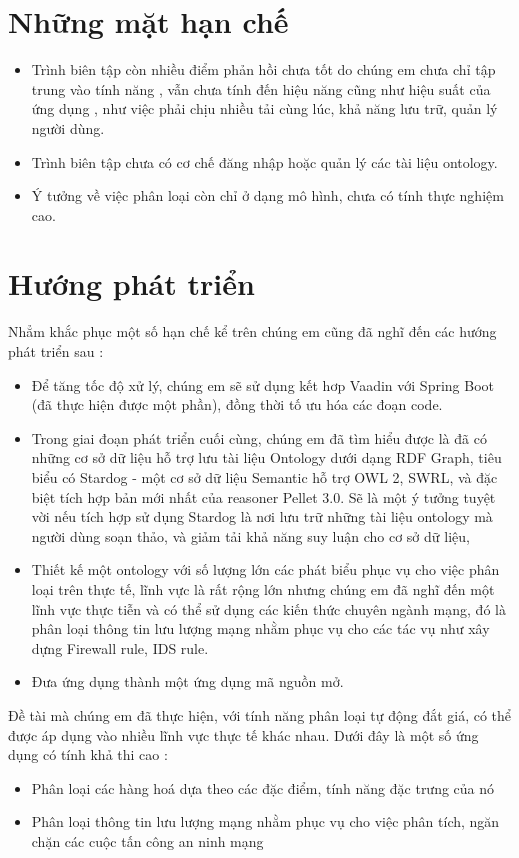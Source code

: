 \section{Những mặt hạn chế}
\begin{itemize}
\item Trình biên tập còn nhiều điểm phản hồi chưa tốt do chúng em chưa chỉ tập trung vào tính năng , vẫn chưa tính đến hiệu năng cũng như hiệu suất của ứng dụng , như việc phải chịu nhiều tải cùng lúc, khả năng lưu trữ, quản lý người dùng.
\item Trình biên tập chưa có cơ chế đăng nhập hoặc quản lý các tài liệu ontology.
\item Ý tưởng về việc phân loại còn chỉ ở dạng mô hình, chưa có tính thực nghiệm cao.
\end{itemize}
\section{Hướng phát triển}
Nhẳm khắc phục một số hạn chế kể trên chúng em cũng đã nghĩ đến các hướng phát triển sau :
\begin{itemize}
\item Để tăng tốc độ xử lý, chúng em sẽ sử dụng kết hơp Vaadin với Spring Boot (đã thực hiện được một phần), đồng thời tố ưu hóa các đoạn code.
\item Trong giai đoạn phát triển cuối cùng, chúng em đã tìm hiểu được là đã có những cơ sở dữ liệu hỗ trợ lưu tài liệu Ontology dưới dạng RDF Graph, tiêu biểu có Stardog - một cơ sở dữ liệu Semantic hỗ trợ OWL 2, SWRL, và đặc biệt tích hợp bản mới nhất của reasoner Pellet 3.0. Sẽ là một ý tưởng tuyệt vời nếu tích hợp sử dụng Stardog là nơi lưu trữ những tài liệu ontology mà người dùng soạn thảo, và giảm tải khả năng suy luận cho cơ sở dữ liệu,
\item Thiết kế một ontology với số lượng lớn các phát biểu phục vụ cho việc phân loại trên thực tế, lĩnh vực là rất rộng lớn nhưng chúng em đã nghĩ đến một lĩnh vực thực tiễn và có thể sử dụng các kiến thức chuyên ngành mạng, đó là phân loại thông tin lưu lượng mạng nhằm phục vụ cho các tác vụ như xây dựng Firewall rule, IDS rule.
\item Đưa ứng dụng thành một ứng dụng mã nguồn mở.
\end{itemize}

Đề tài mà chúng em đã thực hiện, với tính năng phân loại tự động đắt giá, có thể được áp dụng vào nhiều lĩnh vực thực tế khác nhau. Dưới đây là một số ứng dụng có tính khả thi cao :
\begin{itemize}
\item Phân loại các hàng hoá dựa theo các đặc điểm, tính năng đặc trưng của nó
\item Phân loại thông tin lưu lượng mạng nhằm phục vụ cho việc phân tích, ngăn chặn các cuộc tấn công an ninh mạng
\end{itemize}
